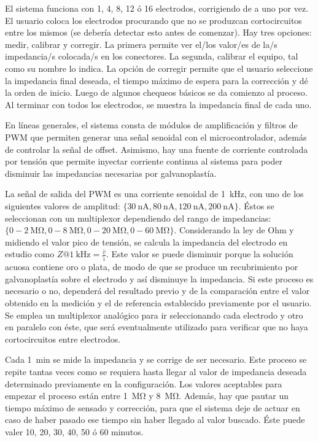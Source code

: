 El sistema funciona con 1, 4, 8, 12 ó 16 electrodos, corrigiendo de a uno por vez. El usuario coloca los electrodos procurando que no se produzcan cortocircuitos entre los mismos (se debería detectar esto antes de comenzar). Hay tres opciones: medir, calibrar y corregir. La primera permite ver el/los valor/es de la/s impedancia/s colocada/s en los conectores. La segunda, calibrar el equipo, tal como su nombre lo indica. La opción de corregir permite que el usuario seleccione la impedancia final deseada, el tiempo máximo de espera para la corrección y dé la orden de inicio. Luego de algunos chequeos básicos se da comienzo al proceso. Al terminar con todos los electrodos, se muestra la impedancia final de cada uno.

En líneas generales, el sistema consta de módulos de amplificación y filtros de PWM que permiten generar una señal senoidal con el microcontrolador, además de controlar la señal de offset. Asimismo, hay una fuente de corriente controlada por tensión que permite inyectar corriente continua al sistema para poder disminuir las impedancias necesarias por galvanoplastía.

La señal de salida del PWM es una corriente senoidal de \SI{1}{\kilo\hertz}, con uno de los siguientes valores de amplitud: $\{\SI{30}{\nano\ampere}, \SI{80}{\nano\ampere}, \SI{120}{\nano\ampere}, \SI{200}{\nano\ampere}\}$. Éstos se seleccionan con un multiplexor dependiendo del rango de impedancias: $\{0-\SI{2}{\mega\ohm}, 0-\SI{8}{\mega\ohm}, 0-\SI{20}{\mega\ohm}, 0-\SI{60}{\mega\ohm}\}$. Considerando la ley de Ohm y midiendo el valor pico de tensión, se calcula la impedancia del electrodo en estudio como $Z@\SI{1}{\kilo\hertz} = \frac{\hat{v}}{\hat{\imath}}$. Este valor se puede disminuir porque la solución acuosa contiene oro o plata, de modo de que se produce un recubrimiento por galvanoplastía sobre el electrodo y así disminuye la impedancia. Si este proceso es necesario o no, dependerá del resultado previo y de la comparación entre el valor obtenido en la medición y el de referencia establecido previamente por el usuario. Se emplea un multiplexor analógico para ir seleccionando cada electrodo y otro en paralelo con éste, que será eventualmente utilizado para verificar que no haya cortocircuitos entre electrodos.

Cada \SI{1}{\minute} se mide la impedancia y se corrige de ser necesario. Este proceso se repite tantas veces como se requiera hasta llegar al valor de impedancia deseada determinado previamente en la configuración. Los valores aceptables para empezar el proceso están entre \SI{1}{\mega\ohm} y \SI{8}{\mega\ohm}. Además, hay que pautar un tiempo máximo de sensado y corrección, para que el sistema deje de actuar en caso de haber pasado ese tiempo sin haber llegado al valor buscado. Éste puede valer 10, 20, 30, 40, 50 ó 60 minutos.

